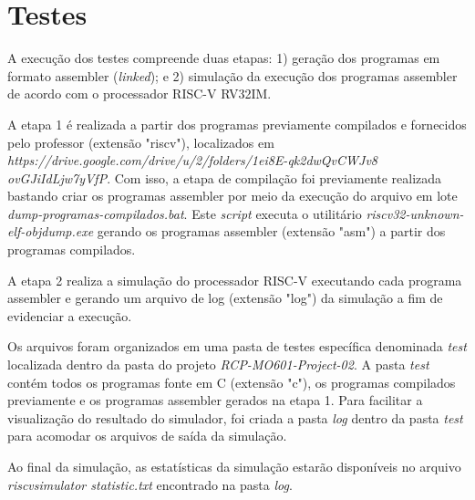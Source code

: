 
\section{Testes}

A execução dos testes compreende duas etapas: 1) geração dos programas em formato assembler (\textit{linked}); e 2) simulação da execução dos programas assembler de acordo com o processador RISC-V RV32IM.

A etapa 1 é realizada a partir dos programas previamente compilados e fornecidos pelo professor (extensão "riscv"), localizados em \textit{https://drive.google.com/drive/u/2/folders/1ei8E-qk2dwQvCWJv8 ovGJiIdLjw7yVfP}. Com isso, a etapa de compilação foi previamente realizada bastando criar os programas assembler por meio da execução do arquivo em lote \textit{dump-programas-compilados.bat}. Este \textit{script} executa o utilitário \textit{riscv32-unknown-elf-objdump.exe} gerando os programas assembler (extensão "asm") a partir dos programas compilados.

A etapa 2 realiza a simulação do processador RISC-V executando cada programa assembler e gerando um arquivo de log (extensão "log") da simulação a fim de evidenciar a execução.

Os arquivos foram organizados em uma pasta de testes específica denominada \textit{test} localizada dentro da pasta do projeto \textit{RCP-MO601-Project-02}. A pasta \textit{test} contém todos os programas fonte em C (extensão "c"), os programas compilados previamente e os programas assembler gerados na etapa 1. Para facilitar a visualização do resultado do simulador, foi criada a pasta \textit{log} dentro da pasta \textit{test} para acomodar os arquivos de saída da simulação.

Ao final da simulação, as estatísticas da simulação estarão disponíveis no arquivo \textit{\textunderscore riscv\textunderscore simulator \textunderscore statistic.txt} encontrado na pasta \textit{log}.